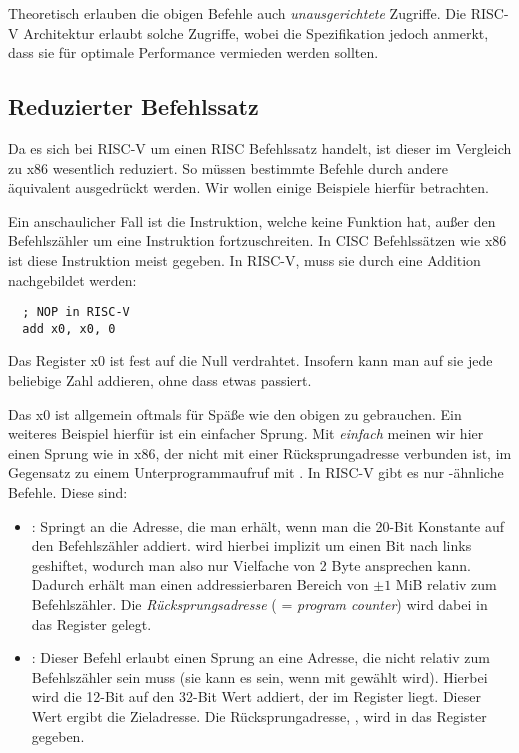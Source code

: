 Theoretisch erlauben die obigen Befehle auch \emph{unausgerichtete}
Zugriffe. Die RISC-V Architektur erlaubt solche Zugriffe, wobei die
Spezifikation jedoch anmerkt, dass sie für optimale Performance vermieden werden
sollten.

\subsection{Reduzierter Befehlssatz}

Da es sich bei RISC-V um einen RISC Befehlssatz handelt, ist dieser im Vergleich
zu x86 wesentlich reduziert. So müssen bestimmte Befehle durch andere äquivalent
ausgedrückt werden. Wir wollen einige Beispiele hierfür betrachten.

Ein anschaulicher Fall ist die  Instruktion, welche keine Funktion
hat, außer den Befehlszähler um eine Instruktion fortzuschreiten. In CISC
Befehlssätzen wie x86 ist diese Instruktion meist gegeben. In RISC-V, muss sie
durch eine Addition nachgebildet werden:

\begin{lstlisting}
  ; NOP in RISC-V
  add x0, x0, 0
\end{lstlisting}

Das Register x0 ist fest auf die Null verdrahtet. Insofern kann man auf sie
jede beliebige Zahl addieren, ohne dass etwas passiert.

Das x0 ist allgemein oftmals für Späße wie den obigen zu gebrauchen. Ein
weiteres Beispiel hierfür ist ein einfacher Sprung. Mit \emph{einfach} meinen
wir hier einen Sprung wie  in x86, der nicht mit einer
Rücksprungadresse verbunden ist, im Gegensatz zu einem Unterprogrammaufruf mit
. In RISC-V gibt es nur -ähnliche Befehle. Diese sind:

\begin{itemize}
  \item {}: Springt an die Adresse, die man
    erhält, wenn man die 20-Bit Konstante  auf den Befehlszähler
    addiert.  wird hierbei implizit um einen Bit nach links
    geshiftet, wodurch man also nur Vielfache von 2 Byte ansprechen
    kann. Dadurch erhält man einen addressierbaren Bereich von $\pm 1$ MiB
    relativ zum Befehlszähler. Die \emph{Rücksprungsadresse} 
    ( = \emph{program counter}) wird dabei in das Register
     gelegt.
 \item {}: Dieser Befehl erlaubt einen
   Sprung an eine Adresse, die nicht relativ zum Befehlszähler sein muss (sie
   kann es sein, wenn  mit  gewählt wird). Hierbei wird
   die 12-Bit  auf den 32-Bit Wert addiert, der im Register
    liegt. Dieser Wert ergibt die Zieladresse. Die
   Rücksprungadresse, , wird in das Register 
   gegeben.
\end{itemize}


